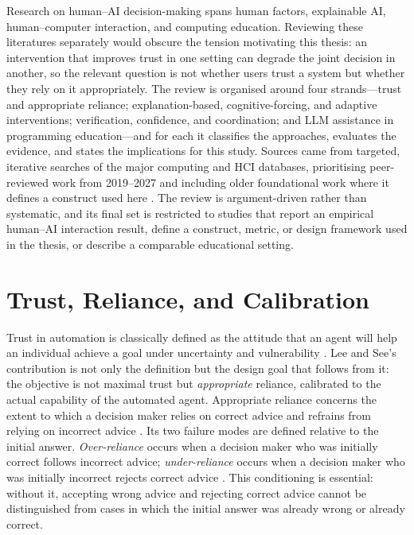 \documentclass[oneside,final,14pt,a4paper]{extreport}
\begin{document}
Research on human--AI decision-making spans human factors, explainable AI,
human--computer interaction, and computing education. Reviewing these
literatures separately would obscure the tension motivating this thesis: an
intervention that improves trust in one setting can degrade the joint decision
in another, so the relevant question is not whether users trust a system but
whether they rely on it appropriately. The review is organised around four
strands---trust and appropriate reliance; explanation-based, cognitive-forcing,
and adaptive interventions; verification, confidence, and coordination; and
LLM assistance in programming education---and for each it classifies the
approaches, evaluates the evidence, and states the implications for this
study. Sources came from targeted, iterative searches of the major computing
and HCI databases, prioritising peer-reviewed work from 2019--2027 and
including older foundational work where it defines a construct used here
\cite{LeeSee2004,KrugerDunning1999}. The review is argument-driven rather than
systematic, and its final set is restricted to studies that report an
empirical human--AI interaction result, define a construct, metric, or design
framework used in the thesis, or describe a comparable educational setting.

\section{Trust, Reliance, and Calibration}
\label{sec:lit-trust}

Trust in automation is classically defined as the attitude that an agent will
help an individual achieve a goal under uncertainty and vulnerability
\cite{LeeSee2004}. Lee and See's contribution is not only the definition but
the design goal that follows from it: the objective is not maximal trust but
\emph{appropriate} reliance, calibrated to the actual capability of the
automated agent. Appropriate reliance concerns the extent to which a decision
maker relies on correct advice and refrains from relying on incorrect advice
\cite{Schemmer2023Appropriate}. Its two failure modes are defined relative to
the initial answer. \emph{Over-reliance} occurs when a decision maker who was
initially correct follows incorrect advice; \emph{under-reliance} occurs when a
decision maker who was initially incorrect rejects correct advice
\cite{Schemmer2023Appropriate,Bo2025}. This conditioning is essential: without
it, accepting wrong advice and rejecting correct advice cannot be distinguished
from cases in which the initial answer was already wrong or already correct.
\end{document}
